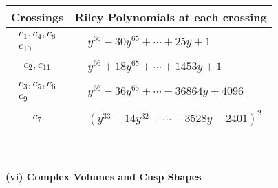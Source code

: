 \documentclass[1p]{elsarticle_modified}
\theoremstyle{definition}
\begin{document}
\begin{tabular}{m{50pt}|m{274pt}}
Crossings & \hspace{64pt}Riley Polynomials at each crossing \\
\hline $$\begin{aligned}c_{1},c_{4},c_{8}\\c_{10}\end{aligned}$$&$\begin{aligned}
&y^{66}-30 y^{65}+\cdots+25 y+1
\end{aligned}$\\
\hline $$\begin{aligned}c_{2},c_{11}\end{aligned}$$&$\begin{aligned}
&y^{66}+18 y^{65}+\cdots+1453 y+1
\end{aligned}$\\
\hline $$\begin{aligned}c_{3},c_{5},c_{6}\\c_{9}\end{aligned}$$&$\begin{aligned}
&y^{66}-36 y^{65}+\cdots-36864 y+4096
\end{aligned}$\\
\hline $$\begin{aligned}c_{7}\end{aligned}$$&$\begin{aligned}
&(y^{33}-14 y^{32}+\cdots-3528 y-2401)^{2}
\end{aligned}$\\
\hline
\end{tabular}\\~\\
\newpage\flushleft \textbf{(vi) Complex Volumes and Cusp Shapes}
\end{document}
